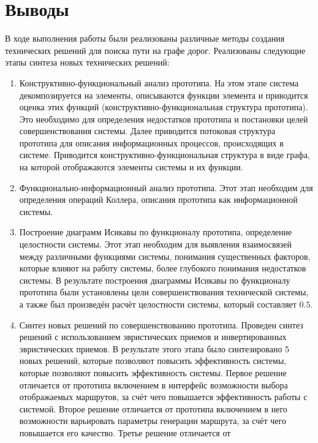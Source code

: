 \chapter{Выводы}
В ходе выполнения работы были реализованы различные методы создания технических решений для 
поиска пути на графе дорог. Реализованы следующие этапы синтеза новых технических решений: 
\begin{enumerate}
    \item Конструктивно-функциональный анализ прототипа. На этом этапе система декомпозируется на 
        элементы, описываются функции элемента и приводится оценка этих функций 
        (конструктивно-функциональная структура прототипа). Это необходимо для определения недостатков 
        прототипа и постановки целей совершенствования системы. Далее приводится потоковая структура 
        прототипа для описания информационных процессов, происходящих в системе. Приводится 
        конструктивно-функциональная структура в виде графа, на которой отображаются элементы 
        системы и их функции. 
    \item Функционально-информационный анализ прототипа. Этот этап необходим для определения 
        операций Коллера, описания прототипа как информационной системы. 
    \item Построение диаграмм Исикавы по функционалу прототипа, определение целостности системы. 
        Этот этап необходим для выявления взаимосвязей между различными функциями системы, понимания 
        существенных факторов, которые влияют на работу системы, более глубокого понимания недостатков 
        системы. В результате построения диаграммы Исикавы по функционалу прототипа были установлены 
        цели совершенствования технической системы, а также был произведён расчёт целостности системы, 
        который составляет \( 0.5 \).
    \item Синтез новых решений по совершенствованию прототипа. Проведен синтез решений с использованием 
        эвристических приемов и инвертированных эвристических приемов. В результате этого этапа было 
        синтезировано 5 новых решений, которые позволяют повысить эффективность системы, которые 
        позволяют повысить эффективность системы. Первое решение отличается от прототипа включением в 
        интерфейс возможности выбора отображаемых маршрутов, за счёт чего повышается эффективность работы 
        с системой. Второе решение отличается от прототипа включением в него возможности варьировать 
        параметры генерации маршрута, за счёт чего повышается его качество. Третье решение отличается от 

\end{enumerate}
